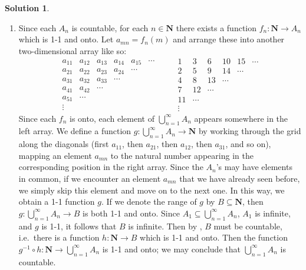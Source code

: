 \documentclass[12pt]{article}
\theoremstyle{definition}
\theoremstyle{exercise}
\theoremstyle{solution}
\newtheorem*{solution}{Solution}
\newcommand{\N}{\mathbf{N}}
\begin{document}
\begin{solution}
\begin{enumerate}
        \item Since each \( A_n \) is countable, for each \( n \in \N \) there exists a function \( f_n : \N \to A_n \) which is 1-1 and onto. Let \( a_{mn} = f_n(m) \) and arrange these into another two-dimensional array like so:
        \[
            \begin{matrix}
            a_{11} & a_{12} & a_{13} & a_{14} & a_{15} & \cdots \\
            a_{21} & a_{22} & a_{23} & a_{24} & \cdots &  \\
            a_{31} & a_{32} & a_{33} & \cdots &  &  \\
            a_{41} & a_{42} & \cdots &   &  &  \\
            a_{51} & \cdots &  &  &  &  \\
            \vdots &  &  &  &  & 
            \end{matrix}
            \qquad
            \begin{matrix}
            1 & 3 & 6 & 10 & 15 & \cdots \\
            2 & 5 & 9 & 14 & \cdots &  \\
            4 & 8 & 13 & \cdots &  &  \\
            7 & 12 & \cdots &   &  &  \\
            11 & \cdots &  &  &  &  \\
            \vdots &  &  &  &  & 
            \end{matrix}
        \]
        Since each \( f_n \) is onto, each element of \( \bigcup_{n=1}^{\infty} A_n \) appears somewhere in the left array. We define a function \( g : \bigcup_{n=1}^{\infty} A_n \to \N \) by working through the grid along the diagonals (first \( a_{11} \), then \( a_{21} \), then \( a_{12} \), then \( a_{31} \), and so on), mapping an element \( a_{mn} \) to the natural number appearing in the corresponding position in the right array. Since the \( A_n \)'s may have elements in common, if we encounter an element \( a_{mn} \) that we have already seen before, we simply skip this element and move on to the next one. In this way, we obtain a 1-1 function \( g \). If we denote the range of \( g \) by \( B \subseteq \N \), then \( g : \bigcup_{n=1}^{\infty} A_n \to B \) is both 1-1 and onto. Since \( A_1 \subseteq \bigcup_{n=1}^{\infty} A_n \), \( A_1 \) is infinite, and \( g \) is 1-1, it follows that \( B \) is infinite. Then by , \( B \) must be countable, i.e.\ there is a function \( h : \N \to B \) which is 1-1 and onto. Then the function \( g^{-1} \circ h : \N \to \bigcup_{n=1}^{\infty} A_n \) is 1-1 and onto; we may conclude that \( \bigcup_{n=1}^{\infty} A_n \) is countable.
    \end{enumerate}
\end{solution}
\end{document}
